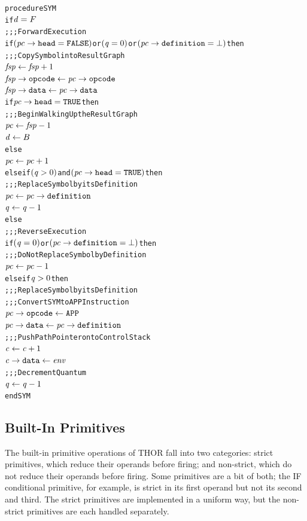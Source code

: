 \par\smallskip\noindent\begin{minipage}{\linewidth}
\begin{alltt}
procedure SYM
  if \(\rt{d} = F\)
    \textrm{;;; Forward Execution}
    if \((\rtfield{pc}{head} = \mathtt{FALSE})\) or \((\rt{q} = 0)\) or \((\rtfield{pc}{definition} = \bot)\) then
      \textrm{;;; Copy Symbol into Result Graph}
      \(\rt{fsp} \leftarrow \rt{fsp}+1\)
      \(\rtfield{fsp}{opcode} \leftarrow \rtfield{pc}{opcode}\)
      \(\rtfield{fsp}{data} \leftarrow \rtfield{pc}{data}\)
      if \(\rtfield{pc}{head} = \mathtt{TRUE}\) then
        \textrm{;;; Begin Walking Up the Result Graph}
        \(\rt{pc} \leftarrow \rt{fsp}-1\)
        \(\rt{d} \leftarrow B\)
      else
        \(\rt{pc} \leftarrow \rt{pc}+1\)
    else if \((\rt{q} > 0)\) and \((\rtfield{pc}{head} = \mathtt{TRUE})\) then
      \textrm{;;; Replace Symbol by its Definition}
      \(\rt{pc} \leftarrow \rtfield{pc}{definition}\)
      \(\rt{q} \leftarrow \rt{q}-1\)
  else
    \textrm{;;; Reverse Execution}
    if \((\rt{q} = 0)\) or \((\rtfield{pc}{definition} = \bot)\) then
      \textrm{;;; Do Not Replace Symbol by Definition}
      \(\rt{pc} \leftarrow \rt{pc}-1\)
    else if \(\rt{q} > 0\) then
      \textrm{;;; Replace Symbol by its Definition}
      \textrm{;;; Convert SYM to APP Instruction}
      \(\rtfield{pc}{opcode} \leftarrow \mathtt{APP}\)
      \(\rtfield{pc}{data} \leftarrow \rtfield{pc}{definition}\)
      \textrm{;;; Push Path Pointer onto Control Stack}
      \(\rt{c} \leftarrow \rt{c}+1\)
      \(\rtfield{c}{data} \leftarrow \rt{env}\)
      \textrm{;;; Decrement Quantum}
      \(\rt{q} \leftarrow \rt{q}-1\)
end SYM
\end{alltt}
\end{minipage}\par\smallskip


\subsection{Built-In Primitives}

The built-in primitive operations of THOR fall into two categories: strict primitives, which reduce their operands before firing; and non-strict, which do not reduce their operands before firing. Some primitives are a bit of both; the IF conditional primitive, for example, is strict in its first operand but not its second and third. The strict primitives are implemented in a uniform way, but the non-strict primitives are each handled separately.

